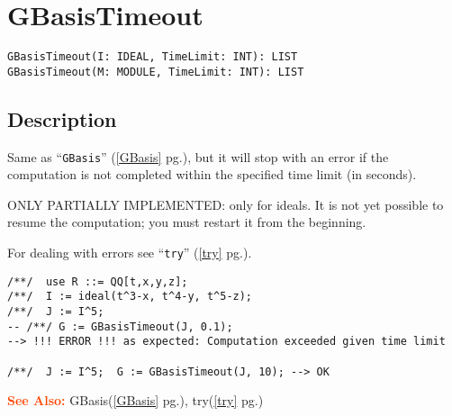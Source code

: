 \documentclass[a4paper]{mybook}
\newenvironment{command}{}{} %
\newcommand\SeeAlso{\par\textcolor{OrangeRed}{\textbf{\large See Also: }}}
\begin{document}
\section{GBasisTimeout}
\label{GBasisTimeout}
\begin{command} %


\begin{Verbatim}[label=syntax, rulecolor=\color{MidnightBlue},
frame=single]
GBasisTimeout(I: IDEAL, TimeLimit: INT): LIST
GBasisTimeout(M: MODULE, TimeLimit: INT): LIST
\end{Verbatim}


\subsection*{Description}

Same as ``\verb&GBasis&'' (\ref{GBasis} pg.\pageref{GBasis}), but it will stop with an error if the
computation is not completed within the specified time limit (in seconds).
\par 
ONLY PARTIALLY IMPLEMENTED: only for ideals.  It is not yet possible to
resume the computation; you must restart it from the beginning.
\par 
For dealing with errors see ``\verb&try&'' (\ref{try} pg.\pageref{try}).
\begin{Verbatim}[label=example, rulecolor=\color{PineGreen}, frame=single]
/**/  use R ::= QQ[t,x,y,z];
/**/  I := ideal(t^3-x, t^4-y, t^5-z);
/**/  J := I^5;
-- /**/ G := GBasisTimeout(J, 0.1);
--> !!! ERROR !!! as expected: Computation exceeded given time limit

/**/  J := I^5;  G := GBasisTimeout(J, 10); --> OK
\end{Verbatim}


\SeeAlso %
  GBasis(\ref{GBasis} pg.\pageref{GBasis}), 
    try(\ref{try} pg.\pageref{try})
\end{command} %
\end{document}
